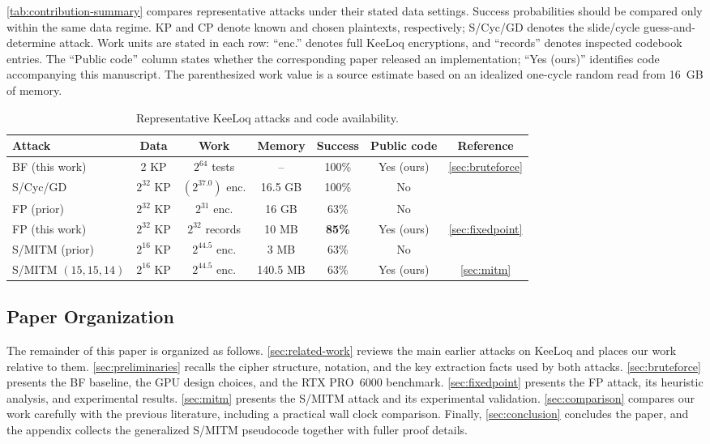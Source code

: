 \documentclass[version=preprint]{iacrcc}
\begin{document}
\autoref{tab:contribution-summary} compares representative attacks under their stated data settings.
Success probabilities should be compared only within the same data regime.
KP and CP denote known and chosen plaintexts, respectively; S/Cyc/GD denotes the slide/cycle guess-and-determine attack.
Work units are stated in each row: ``enc.'' denotes full KeeLoq encryptions, and ``records'' denotes inspected codebook entries.
The ``Public code'' column states whether the corresponding paper released an implementation; ``Yes (ours)'' identifies code accompanying this manuscript.
The parenthesized work value is a source estimate based on an idealized one-cycle random read from 16~GB of memory.

\begin{table}[htbp]
  \centering
  \caption{Representative KeeLoq attacks and code availability.}
  \label{tab:contribution-summary}
  \footnotesize
  \setlength{\tabcolsep}{3.5pt}
  \renewcommand{\arraystretch}{1.05}
  \begin{tabular}{@{}lcccccc@{}}
    \toprule
    Attack & Data & Work & Memory & Success & Public code & Reference \\
    \midrule
    BF (this work) & 2 KP & $2^{64}$ tests & -- & 100\% & Yes (ours) & \autoref{sec:bruteforce} \\
    S/Cyc/GD & $2^{32}$ KP & $(2^{37.0})$ enc. & 16.5 GB & 100\% & No & \cite{bogdanov2007linear} \\
    FP (prior) & $2^{32}$ KP & $2^{31}$ enc. & 16 GB & 63\% & No & \cite{courtois2007algebraic} \\
    FP (this work) & $2^{32}$ KP & $2^{32}$ records & 10 MB & \textbf{85\%} & Yes (ours) & \autoref{sec:fixedpoint} \\
    S/MITM (prior) & $2^{16}$ KP & $2^{44.5}$ enc. & 3 MB & 63\% & No & \cite{indesteege2008practical} \\
    S/MITM $(15,15,14)$ & $2^{16}$ KP & $2^{44.5}$ enc. & 140.5 MB & 63\% & Yes (ours) & \autoref{sec:mitm} \\
    \bottomrule
  \end{tabular}
\end{table}

\subsection{Paper Organization}

The remainder of this paper is organized as follows.
\autoref{sec:related-work} reviews the main earlier attacks on KeeLoq and places our work relative to them.
\autoref{sec:preliminaries} recalls the cipher structure, notation, and the key extraction facts used by both attacks.
\autoref{sec:bruteforce} presents the BF baseline, the GPU design choices, and the RTX PRO~6000 benchmark.
\autoref{sec:fixedpoint} presents the FP attack, its heuristic analysis, and experimental results.
\autoref{sec:mitm} presents the S/MITM attack and its experimental validation.
\autoref{sec:comparison} compares our work carefully with the previous literature, including a practical wall clock comparison.
Finally, \autoref{sec:conclusion} concludes the paper, and the appendix collects the generalized S/MITM pseudocode together with fuller proof details.
\end{document}
